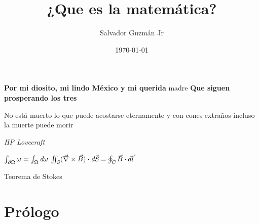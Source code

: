 \documentclass{article}
\begin{document}
	\title{\Large{\textbf{¿Que es la matemática?}}}
	
	\author{Salvador Guzm\'{a}n Jr}
	\date{\today}
	\maketitle
	
	\pagebreak
	\begin{center}
		\thispagestyle{empty}
		\vspace*{\fill}
		\textbf{Por mi diosito, mi lindo M\'{e}xico y mi querida} madre
		\linebreak
		\textbf{Que siguen prosperando los tres}
		\vspace*{\fill}
	\end{center}
	\pagebreak
	\begin{center}
		\epigraph{
			No est\'{a} muerto lo que puede acostarse eternamente
			y con eones extraños  incluso la muerte puede morir
		}{\textit{
			HP Lovecraft
		}}
		\epigraph{
			\begin{math}
				\int_{\partial\Omega} \omega=\int_{\Omega} \emph{d}\omega
			\end{math}
		\linebreak
		\linebreak
			\begin{math}
				\iint_{\emph{S}}(\vec{\nabla}\times\vec{B})\cdot \emph{d}\vec{\emph{S}}=\oint_{\emph{C}}\vec{B}\cdot d \vec{l}
			\end{math}
		}{
			Teorema de Stokes
		}
	\end{center}
	\pagebreak
	\tableofcontents
	\pagebreak
	
	\section{Prólogo}
\end{document}
